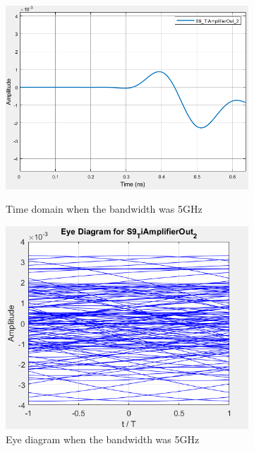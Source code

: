 \begin{figure}[H]
	\centering
        \begin{subfigure}{.55\textwidth}
        \centering
        	\includegraphics[scale=0.45]{./lib/m_qam_receiver/figure_PLoureiro/4QAM_ElectricallNoise_50e8_time.png}
        \label{Example_Time_5GHz}\caption{Time domain when the bandwidth was 5GHz}
        \end{subfigure}%
        \begin{subfigure}{.55\textwidth}
        \centering
        	\includegraphics[scale=0.45]{./lib/m_qam_receiver/figure_PLoureiro/4QAM_ElectricalNoise_50e8_Eye.png}
        	\caption{Eye diagram when the bandwidth was 5GHz}\label{Example_Eye_5GHz}
        \end{subfigure}
        \caption{}\label{5GHz}
\end{figure}

